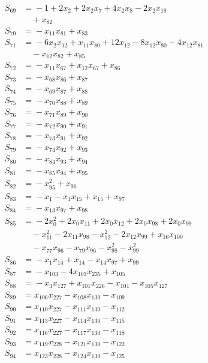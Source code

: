 \begin{align*}
S_{69} &={} -1 +2x_{2} +2x_{2}x_{7} +4x_{2}x_{8} -2x_{2}x_{18} \\
&\quad{} +x_{82} \\
S_{70} &={} -x_{11}x_{81} +x_{83} \\
S_{71} &={} -6x_{2}x_{12} +x_{11}x_{80} +12x_{12} -8x_{12}x_{80} -4x_{12}x_{81} \\
&\quad{} -x_{12}x_{82} +x_{85} \\
S_{72} &={} -x_{11}x_{67} +x_{12}x_{67} +x_{86} \\
S_{73} &={} -x_{68}x_{86} +x_{87} \\
S_{74} &={} -x_{69}x_{87} +x_{88} \\
S_{75} &={} -x_{70}x_{88} +x_{89} \\
S_{76} &={} -x_{71}x_{89} +x_{90} \\
S_{77} &={} -x_{72}x_{90} +x_{91} \\
S_{78} &={} -x_{73}x_{91} +x_{92} \\
S_{79} &={} -x_{74}x_{92} +x_{93} \\
S_{80} &={} -x_{84}x_{93} +x_{94} \\
S_{81} &={} -x_{85}x_{94} +x_{95} \\
S_{82} &={} -x_{95}^{2} +x_{96} \\
S_{83} &={} -x_{1} -x_{1}x_{15} +x_{15} +x_{97} \\
S_{84} &={} -x_{13}x_{97} +x_{98} \\
S_{85} &={} -2x_{0}^{2} +2x_{0}x_{11} +2x_{0}x_{12} +2x_{0}x_{98} +2x_{0}x_{99} \\
&\quad{} -x_{11}^{2} -2x_{11}x_{98} -x_{12}^{2} -2x_{12}x_{99} +x_{16}x_{100} \\
&\quad{} -x_{77}x_{96} -x_{79}x_{96} -x_{98}^{2} -x_{99}^{2} \\
S_{86} &={} -x_{1}x_{14} +x_{14} -x_{14}x_{97} +x_{99} \\
S_{87} &={} -x_{103} -4x_{103}x_{235} +x_{105} \\
S_{88} &={} -x_{3}x_{127} +x_{101}x_{226} -x_{104} -x_{105}x_{127} \\
S_{89} &={} x_{106}x_{227} -x_{108}x_{130} -x_{109} \\
S_{90} &={} x_{110}x_{227} -x_{111}x_{130} -x_{112} \\
S_{91} &={} x_{113}x_{227} -x_{114}x_{130} -x_{115} \\
S_{92} &={} x_{116}x_{227} -x_{117}x_{130} -x_{118} \\
S_{93} &={} x_{119}x_{228} -x_{121}x_{130} -x_{122} \\
S_{94} &={} x_{123}x_{228} -x_{124}x_{130} -x_{125} \\

\end{align*}
